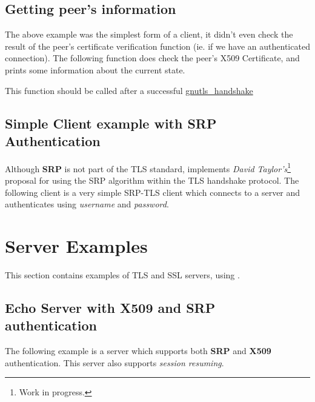 \documentclass{book}
\begin{document}
\subsection{Getting peer's information}
\par The above example was the simplest form of a client, it didn't even check
the result of the peer's certificate verification function (ie. if we have
an authenticated connection). The following function does check the peer's X509
Certificate, and prints some information about the current state.
\par
This function should be called after a successful
\hyperref{gnutls\_handshake()}{gnutls\_handshake() (see Section }{ for more information)}{gnutls_handshake}





\subsection{Simple Client example with SRP Authentication}
Although {\bf SRP} is not part of the TLS standard, \gnutls implements
{\it David Taylor's}\footnote{Work in progress.} proposal for using the SRP algorithm
within the TLS handshake protocol. The following client
is a very simple SRP-TLS client which connects to a server 
and authenticates using {\it username} and {\it password}.



\section{Server Examples}
This section contains examples of TLS and SSL servers, using \gnutls.

\subsection{Echo Server with X509 and SRP authentication}
The following example is a server which supports both {\bf SRP} and {\bf X509} authentication.
This server also supports {\it session resuming}.







\end{document}
